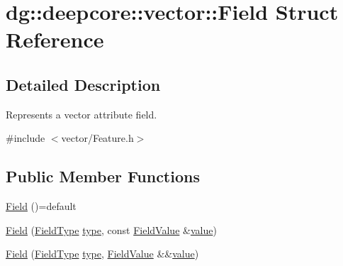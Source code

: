 \hypertarget{structdg_1_1deepcore_1_1vector_1_1_field}{}\section{dg\+:\+:deepcore\+:\+:vector\+:\+:Field Struct Reference}
\label{structdg_1_1deepcore_1_1vector_1_1_field}


\subsection{Detailed Description}
Represents a vector attribute field. 

{\ttfamily \#include $<$vector/\+Feature.\+h$>$}

\subsection*{Public Member Functions}
\begin{DoxyCompactItemize}
\item 
\hyperlink{structdg_1_1deepcore_1_1vector_1_1_field_aa1488f634731a60718d69f4a7a6b90c2}{Field} ()=default
\item 
\hyperlink{structdg_1_1deepcore_1_1vector_1_1_field_ada62e105690439628f1b828d0a1a0f14}{Field} (\hyperlink{group___vector_module_gaedcee2e418daac47dd4516efa9a0b99d}{Field\+Type} \hyperlink{structdg_1_1deepcore_1_1vector_1_1_field_a890ae81662f3867f7617afa70c773535}{type}, const \hyperlink{group___vector_module_ga4b8ce414fd5c655308a07474c35828c0}{Field\+Value} \&\hyperlink{structdg_1_1deepcore_1_1vector_1_1_field_a236f34fb91447d2c807943a28ebcd119}{value})
\item 
\hyperlink{structdg_1_1deepcore_1_1vector_1_1_field_adf038346df08c470ca01331a5f36ef35}{Field} (\hyperlink{group___vector_module_gaedcee2e418daac47dd4516efa9a0b99d}{Field\+Type} \hyperlink{structdg_1_1deepcore_1_1vector_1_1_field_a890ae81662f3867f7617afa70c773535}{type}, \hyperlink{group___vector_module_ga4b8ce414fd5c655308a07474c35828c0}{Field\+Value} \&\&\hyperlink{structdg_1_1deepcore_1_1vector_1_1_field_a236f34fb91447d2c807943a28ebcd119}{value})
\end{DoxyCompactItemize}
